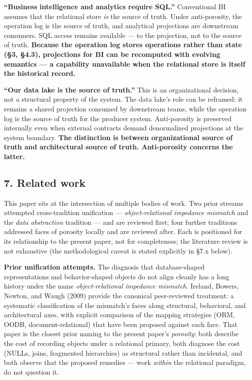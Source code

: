 \documentclass[
]{article}
\begin{document}
\textbf{``Business intelligence and analytics require SQL.''}
Conventional BI assumes that the relational store \emph{is} the source
of truth. Under anti-porosity, the operation log is the source of truth,
and analytical projections are downstream consumers. SQL access remains
available --- to the projection, not to the source of truth.
\textbf{Because the operation log stores operations rather than state
(§3, §4.3), projections for BI can be recomputed with evolving semantics
--- a capability unavailable when the relational store is itself the
historical record.}

\textbf{``Our data lake is the source of truth.''} This is an
organizational decision, not a structural property of the system. The
data lake's role can be reframed: it remains a shared projection
consumed by downstream teams, while the operation log is the source of
truth for the producer system. Anti-porosity is preserved internally
even when external contracts demand denormalized projections at the
system boundary. \textbf{The distinction is between organizational
source of truth and architectural source of truth. Anti-porosity
concerns the latter.}

\subsection{7. Related work}\label{related-work}

This paper sits at the intersection of multiple bodies of work. Two
prior streams attempted cross-tradition unification ---
\emph{object-relational impedance mismatch} and the \emph{data
abstraction} tradition --- and are reviewed first; four further
traditions addressed faces of porosity locally and are reviewed after.
Each is positioned for its relationship to the present paper, not for
completeness; the literature review is not exhaustive (the
methodological caveat is stated explicitly in §7.x below).

\textbf{Prior unification attempts.} The diagnosis that database-shaped
representations and behavior-shaped objects do not align cleanly has a
long history under the name \emph{object-relational impedance mismatch}.
Ireland, Bowers, Newton, and Waugh (2009) provide the canonical
peer-reviewed treatment: a systematic classification of the mismatch's
faces along structural, behavioral, and architectural axes, with
explicit comparison of the mapping strategies (ORM, OODB,
document-relational) that have been proposed against each face. That
paper is the closest prior naming to the present paper's
\emph{porosity}: both describe the cost of recording objects under a
relational primary, both diagnose the cost (NULLs, joins, fragmented
hierarchies) as structural rather than incidental, and both observe that
the proposed remedies --- work \emph{within} the relational paradigm, do
not question it.
\end{document}
